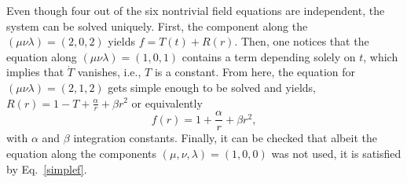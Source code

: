 \begin{widetext}
\end{widetext}
Even though four out of the six nontrivial field equations are independent, the system can be solved uniquely. First, the component along the $(\mu\nu\lambda) = (2,0,2)$ yields $f = T(t) + R(r)$. Then, one notices that the equation along $(\mu\nu\lambda) = (1,0,1)$ contains a term depending solely on $t$, which implies that $\dot{T}$ vanishes, i.e., $T$ is a constant. From here, the equation for $(\mu\nu\lambda) = (2,1,2)$ gets simple enough to be solved and yields, \mbox{$R(r) = 1 - T + \frac{\alpha}{r} + \beta r^2$} or equivalently
\begin{equation}
  f(r) = 1 + \frac{\alpha}{r} + \beta r^2,
  \label{simplef}
\end{equation}
with $\alpha$ and $\beta$ integration constants. Finally, it can be checked that albeit the equation along the components $(\mu,\nu,\lambda) = (1,0,0)$ was not used, it is satisfied by Eq.~\eqref{simplef}.

